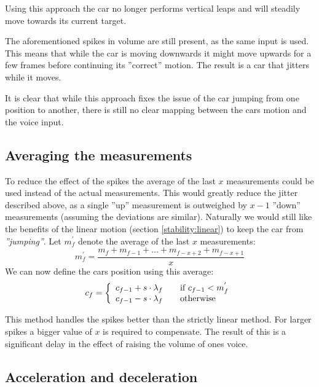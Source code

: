 Using this approach the car no longer performs vertical leaps and will steadily move towards its current target.

The aforementioned spikes in volume are still present, as the same input is used.
This means that while the car is moving downwards it might move upwards for a few frames before continuing its ''correct'' motion.
The result is a car that jitters while it moves.

It is clear that while this approach fixes the issue of the car jumping from one position to another, there is still no clear mapping between the cars motion and the voice input.

\subsection{Averaging the measurements}
To reduce the effect of the spikes the average of the last $x$ measurements could be used instead of the actual measurements.
This would greatly reduce the jitter described above, as a single ''up'' measurement is outweighed by $x-1$ ''down'' measurements (assuming the deviations are similar).
Naturally we would still like the benefits of the linear motion (section \ref{stability:linear}) to keep the car from \textit{''jumping''}.
Let $m^{'}_{f}$ denote the average of the last $x$ measurements:
$$m^{'}_{f} = \frac{m_f + m_{f-1} + \dots + m_{f-x+2} + m_{f-x+1}}{x}$$
We can now define the cars position using this average:
$$c_f = \left\{ 
  \begin{array}{l l}
    c_{f-1} + s \cdot \lambda_f & \quad \text{if $c_{f-1} < m^{'}_{f}$}\\
    c_{f-1} - s \cdot \lambda_f & \quad \text{otherwise}
  \end{array} \right.$$

This method handles the spikes better than the strictly linear method.
For larger spikes a bigger value of $x$ is required to compensate.
The result of this is a significant delay in the effect of raising the volume of ones voice.

\subsection{Acceleration and deceleration}

